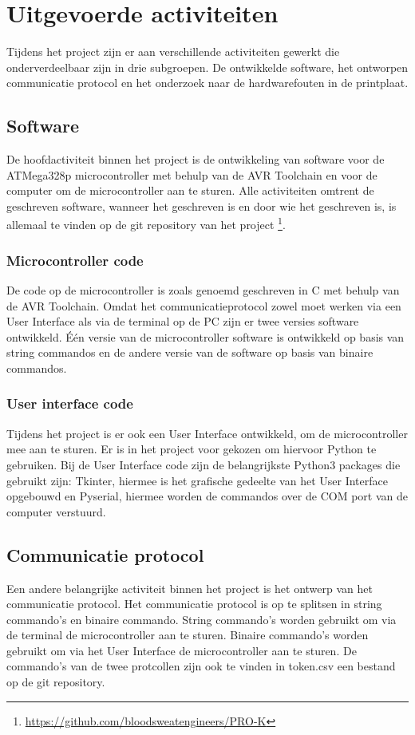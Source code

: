 \section{Uitgevoerde activiteiten}
Tijdens het project zijn er aan verschillende activiteiten gewerkt die onderverdeelbaar zijn in drie subgroepen. De ontwikkelde software, het ontworpen communicatie protocol en het onderzoek naar de hardwarefouten in de printplaat.

\subsection{Software}
De hoofdactiviteit binnen het project is de ontwikkeling van software voor de ATMega328p microcontroller met behulp van de AVR Toolchain en voor de computer om de microcontroller aan te sturen. Alle activiteiten omtrent de geschreven software, wanneer het geschreven is en door wie het geschreven is, is allemaal te vinden op de git repository van het project \footnote{\href{https://github.com/bloodsweatengineers/PRO-K}{https://github.com/bloodsweatengineers/PRO-K}}\label{footnote}.
\subsubsection{Microcontroller code}
De code op de microcontroller is zoals genoemd geschreven in C met behulp van de AVR Toolchain. Omdat het communicatieprotocol zowel moet werken via een User Interface als via de terminal op de PC zijn er twee versies software ontwikkeld. Één versie van de microcontroller software is ontwikkeld op basis van string commandos en de andere versie van de software op basis van binaire commandos.
\subsubsection{User interface code}
Tijdens het project is er ook een User Interface ontwikkeld, om de microcontroller mee aan te sturen. Er is in het project voor gekozen om hiervoor Python te gebruiken. Bij de User Interface code zijn de belangrijkste Python3 packages die gebruikt zijn: Tkinter, hiermee is het grafische gedeelte van het User Interface opgebouwd en Pyserial, hiermee worden de commandos over de COM port van de computer verstuurd.

\subsection{Communicatie protocol}
Een andere belangrijke activiteit binnen het project is het ontwerp van het communicatie protocol. Het communicatie protocol is op te splitsen in string commando's en binaire commando. String commando's worden gebruikt om via de terminal de microcontroller aan te sturen. Binaire commando's worden gebruikt om via het User Interface de microcontroller aan te sturen. De commando's van de twee protcollen zijn ook te vinden in token.csv een bestand op de git repository.

